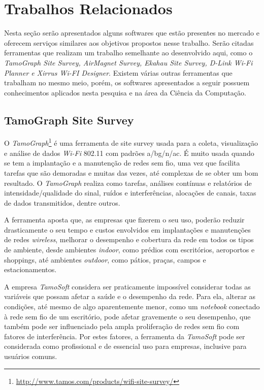 \documentclass[
	12pt,				%
	openright,			%
	twoside,			%
	a4paper,			%
	english,			%
	french,				%
	spanish,			%
	brazil				%
	]{abntex2}
\begin{document}
\section[Trabalhos Relacionados]{Trabalhos Relacionados}

Nesta seção serão apresentados alguns softwares que estão presentes no mercado e oferecem serviços similares aos objetivos propostos nesse trabalho. Serão citadas ferramentas que realizam um trabalho semelhante ao desenvolvido aqui, como o \textit{TamoGraph Site Survey, AirMagnet Survey, Ekahau Site Survey, D-Link Wi-Fi Planner e Xirrus Wi-FI Designer}. Existem várias outras ferramentas que trabalham no mesmo meio, porém, os softwares apresentados a seguir possuem conhecimentos aplicados nesta pesquisa e na área da Ciência da Computação.

\subsection[TamoGraph Site Survey]{TamoGraph Site Survey}

O \textit{TamoGraph}\footnote{\url{http://www.tamos.com/products/wifi-site-survey/}} é uma ferramenta de site survey usada para a coleta, visualização e análise de dados \textit{Wi-Fi} 802.11 com padrões a/bg/n/ac. É muito usada quando se tem a implantação e a manutenção de redes sem fio, uma vez que facilita tarefas que são demoradas e muitas das vezes, até complexas de se obter um bom resultado. O \textit{TamoGraph} realiza como tarefas, análises contínuas e relatórios de intensidade/qualidade do sinal, ruídos e interferências, alocações de canais, taxas de dados transmitidos, dentre outros.

A ferramenta aposta que, as empresas que fizerem o seu uso, poderão reduzir drasticamente o seu tempo e custos envolvidos em implantações e manutenções de redes \textit{wireless}, melhorar o desempenho e cobertura da rede em todos os tipos de ambiente, desde ambientes \textit{indoor}, como prédios com escritórios, aeroportos e shoppings, até ambientes \textit{outdoor}, como pátios, praças, campos e estacionamentos.

A empresa \textit{TamoSoft} considera ser praticamente impossível considerar todas as variáveis que possam afetar a saúde e o desempenho da rede. Para ela, alterar as condições, até mesmo de algo aparentemente menor, como um \textit{notebook} conectado à rede sem fio de um escritório, pode afetar gravemente o seu desempenho, que também pode ser influenciado pela ampla proliferação de redes sem fio com fatores de interferência. Por estes fatores, a ferramenta da \textit{TamoSoft} pode ser considerada como profissional e de essencial uso para empresas, inclusive para usuários comuns.
\end{document}
